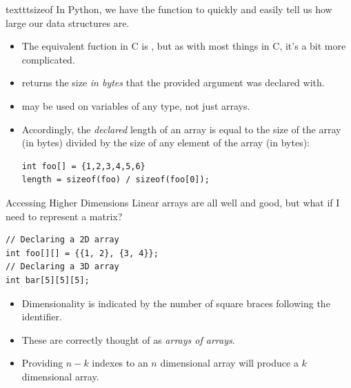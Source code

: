 \documentclass[11pt]{beamer}
\let\OldTexttt\texttt
\renewcommand{\texttt}[1]{\OldTexttt{\color{teal}{#1}}}
\begin{document}
\begin{frame}[fragile=singleslide]{texttt{sizeof}}
In Python, we have the \texttt{len()} function to quickly and easily tell us how large our data structures are.  
\begin{itemize}
\item The equivalent fuction in C is \texttt{sizeof()}, but as with most things in C, it's a bit more complicated.
\item \texttt{sizeof()} returns the size \emph{in bytes} that the provided argument was declared with.   
\item \texttt{sizeof()} may be used on variables of any type, not just arrays.
\item Accordingly, the \emph{declared} length of an array is equal to the size of the array (in bytes) divided by the size of any element of the array (in bytes):
\begin{lstlisting}[style=C]
int foo[] = {1,2,3,4,5,6}
length = sizeof(foo) / sizeof(foo[0]);
\end{lstlisting}
\end{itemize}
\end{frame}

\begin{frame}[fragile=singleslide]{Accessing Higher Dimensions}
Linear arrays are all well and good, but what if I need to represent a matrix? 
\begin{lstlisting}[style=C]
// Declaring a 2D array
int foo[][] = {{1, 2}, {3, 4}};
// Declaring a 3D array
int bar[5][5][5];
\end{lstlisting}
\begin{itemize}
\item Dimensionality is indicated by the number of square braces following the identifier.
\item These are correctly thought of as \emph{arrays of arrays}.
\item Providing $n-k$ indexes to an $n$ dimensional array will produce a $k$ dimensional array.
\end{itemize}
\end{frame}
\end{document}
